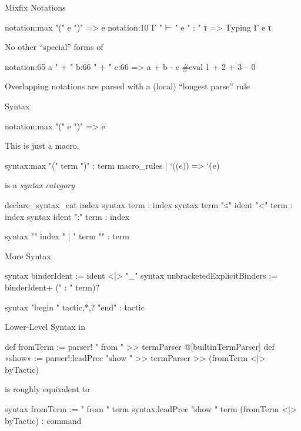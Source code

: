 \documentclass[t]{beamer}
\begin{document}
\begin{frame}[fragile]{Mixfix Notations}
\begin{leancode}
notation:max "(" e ")" => e
notation:10 Γ " ⊢ " e " : " τ => Typing Γ e τ
\end{leancode}
  No other ``special'' forms of 
  \pause
\begin{leancode}
notation:65 a " + " b:66 " + " c:66 => a + b - c
#eval 1 + 2 + 3  -- 0
\end{leancode}
  Overlapping notations are parsed with a (local) ``longest parse'' rule
\end{frame}

\begin{frame}[fragile]{Syntax}
\begin{leancode}
notation:max "(" e ")" => e
\end{leancode}
  This is just a macro.
\begin{leancode}
syntax:max "(" term ")" : term
macro_rules
| `(($e)) => `($e)
\end{leancode}
   is a \emph{syntax category}
  \pause
\begin{leancode}
declare_syntax_cat index
syntax term : index
syntax term "≤" ident "<" term : index
syntax ident ":" term : index

syntax "{" index " | " term "}" : term
\end{leancode}
\end{frame}

\begin{frame}[fragile]{More Syntax}
\begin{leancode}
syntax binderIdent                := ident <|> "_"
syntax unbracketedExplicitBinders := binderIdent+ (" : " term)?

syntax "begin " tactic,*,? "end" : tactic
\end{leancode}
\end{frame}

\begin{frame}[fragile]{Lower-Level Syntax in }
\begin{leancode}
def fromTerm := parser! " from " >> termParser
@[builtinTermParser] def «show» := parser!:leadPrec "show " >> termParser >> (fromTerm <|> byTactic)
\end{leancode}
  is roughly equivalent to
\begin{leancode}
syntax fromTerm := " from " term
syntax:leadPrec "show " term (fromTerm <|> byTactic) : command
\end{leancode}
\end{frame}
\end{document}
